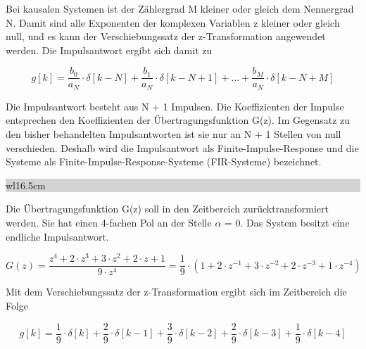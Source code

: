 \noindent Bei kausalen Systemen ist der Z\"{a}hlergrad M kleiner oder gleich dem Nennergrad N. Damit sind alle Exponenten der komplexen Variablen z kleiner oder gleich null, und es kann der Verschiebungssatz der z-Transformation angewendet werden. Die Impulsantwort ergibt sich damit zu

\begin{equation}\label{eq:sixsonehundredeight}
g\left[k\right]=\frac{b_{0} }{a_{N} } \cdot \delta \left[k-N\right]+\frac{b_{1} }{a_{N} } \cdot \delta \left[k-N+1\right]+...+\frac{b_{M} }{a_{N} } \cdot \delta \left[k-N+M\right]
\end{equation}

\noindent Die Impulsantwort besteht aus N + 1 Impulsen. Die Koeffizienten der Impulse entsprechen den Koeffizienten der \"{U}bertragungsfunktion G(z). Im Gegensatz zu den bisher behandelten Impulsantworten ist sie nur an N + 1 Stellen von null verschieden. Deshalb wird die Impulsantwort als Finite-Impulse-Response und die Systeme als Finite-Impulse-Response-Systeme (FIR-Systeme) bezeichnet.\bigskip

\noindent
\colorbox{lightgray}{%
%
\renewcommand\arraystretch{0.6}%
\begin{tabular}{ wl{16.5cm} }
{\selectfont{Beispiel: N-facher Pol im Koordinatenursprung}}
\end{tabular}%
}\medskip

\noindent Die \"{U}bertragungsfunktion G(z) soll in den Zeitbereich zur\"{u}cktransformiert werden. Sie hat einen 4-fachen Pol an der Stelle $\alpha$ = 0. Das System besitzt eine endliche Impulsantwort.

\begin{equation}\label{eq:sixsonehundrednine}
G\left(z\right)=\frac{z^{4} +2\cdot z^{3} +3\cdot z^{2} +2\cdot z+1}{9\cdot z^{4} } =\frac{1}{9} \cdot \left(1+2\cdot z^{-1} +3\cdot z^{-2} +2\cdot z^{-3} +1\cdot z^{-4} \right)
\end{equation}

\noindent Mit dem Verschiebungssatz der z-Transformation ergibt sich im Zeitbereich die Folge

\begin{equation}\label{eq:sixsonehundredten}
g\left[k\right]=\frac{1}{9} \cdot \delta \left[k\right]+\frac{2}{9} \cdot \delta \left[k-1\right]+\frac{3}{9} \cdot \delta \left[k-2\right]+\frac{2}{9} \cdot \delta \left[k-3\right]+\frac{1}{9} \cdot \delta \left[k-4\right]
\end{equation}

